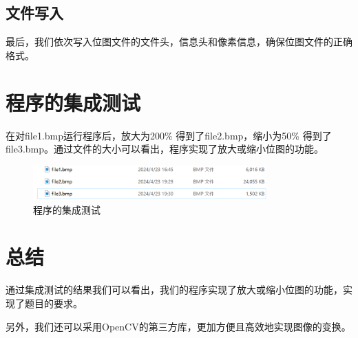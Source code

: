 \documentclass{ctexart}
\begin{document}
    \subsection{文件写入}
    最后，我们依次写入位图文件的文件头，信息头和像素信息，确保位图文件的正确格式。
    
    \section{程序的集成测试}
    在对file1.bmp运行程序后，放大为200\% 得到了file2.bmp，缩小为50\% 得到了file3.bmp。通过文件的大小可以看出，程序实现了放大或缩小位图的功能。
    
    \begin{figure}[h] %
        \centering
        \includegraphics[width=0.8\textwidth]{result.png}
        \caption{程序的集成测试}  
    \end{figure}
    
    \section{总结}
    通过集成测试的结果我们可以看出，我们的程序实现了放大或缩小位图的功能，实现了题目的要求。
    
    另外，我们还可以采用OpenCV的第三方库，更加方便且高效地实现图像的变换。
    
    
\end{document}
